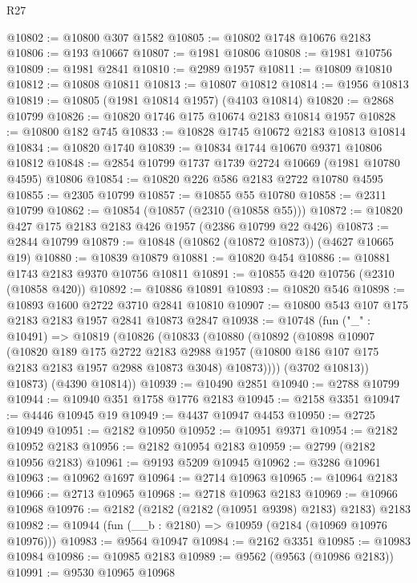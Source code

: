 \begin{lexlean}{R27}
\begin{coremodule}
@10802 := @10800 @307 @1582
@10805 := @10802 @1748 @10676 @2183
@10806 := @193 @10667
@10807 := @1981 @10806
@10808 := @1981 @10756
@10809 := @1981 @2841
@10810 := @2989 @1957
@10811 := @10809 @10810
@10812 := @10808 @10811
@10813 := @10807 @10812
@10814 := @1956 @10813
@10819 := @10805 (@1981 @10814 @1957) (@4103 @10814)
@10820 := @2868 @10799
@10826 := @10820 @1746 @175 @10674 @2183 @10814 @1957
@10828 := @10800 @182 @745
@10833 := @10828 @1745 @10672 @2183 @10813 @10814
@10834 := @10820 @1740
@10839 := @10834 @1744 @10670 @9371 @10806 @10812
@10848 := @2854 @10799 @1737 @1739 @2724 @10669 (@1981 @10780 @4595) @10806
@10854 := @10820 @226 @586 @2183 @2722 @10780 @4595
@10855 := @2305 @10799
@10857 := @10855 @55 @10780
@10858 := @2311 @10799
@10862 := @10854 (@10857 (@2310 (@10858 @55)))
@10872 := @10820 @427 @175 @2183 @2183 @426 @1957 (@2386 @10799 @22 @426)
@10873 := @2844 @10799
@10879 := @10848 (@10862 (@10872 @10873)) (@4627 @10665 @19)
@10880 := @10839 @10879
@10881 := @10820 @454
@10886 := @10881 @1743 @2183 @9370 @10756 @10811
@10891 := @10855 @420 @10756 (@2310 (@10858 @420))
@10892 := @10886 @10891
@10893 := @10820 @546
@10898 := @10893 @1600 @2722 @3710 @2841 @10810
@10907 := @10800 @543 @107 @175 @2183 @2183 @1957 @2841 @10873 @2847
@10938 := @10748
    (fun ("_" : @10491) =>
    @10819
      (@10826
        (@10833
          (@10880
            (@10892
              (@10898
                @10907
                (@10820
                  @189
                  @175
                  @2722
                  @2183
                  @2988
                  @1957
                  (@10800 @186 @107 @175 @2183 @2183 @1957 @2988 @10873 @3048)
                  @10873))))
          (@3702 @10813))
        @10873)
      (@4390 @10814))
@10939 := @10490 @2851
@10940 := @2788 @10799
@10944 := @10940 @351 @1758 @1776 @2183
@10945 := @2158 @3351
@10947 := @4446 @10945 @19
@10949 := @4437 @10947 @4453
@10950 := @2725 @10949
@10951 := @2182 @10950
@10952 := @10951 @9371
@10954 := @2182 @10952 @2183
@10956 := @2182 @10954 @2183
@10959 := @2799 (@2182 @10956 @2183)
@10961 := @9193 @5209 @10945
@10962 := @3286 @10961
@10963 := @10962 @1697
@10964 := @2714 @10963
@10965 := @10964 @2183
@10966 := @2713 @10965
@10968 := @2718 @10963 @2183
@10969 := @10966 @10968
@10976 := @2182 (@2182 (@2182 (@10951 @9398) @2183) @2183) @2183
@10982 := @10944 (fun (__b : @2180) => @10959 (@2184 (@10969 @10976 @10976)))
@10983 := @9564 @10947
@10984 := @2162 @3351
@10985 := @10983 @10984
@10986 := @10985 @2183
@10989 := @9562 (@9563 (@10986 @2183))
@10991 := @9530 @10965 @10968

\end{coremodule}
\end{lexlean}
